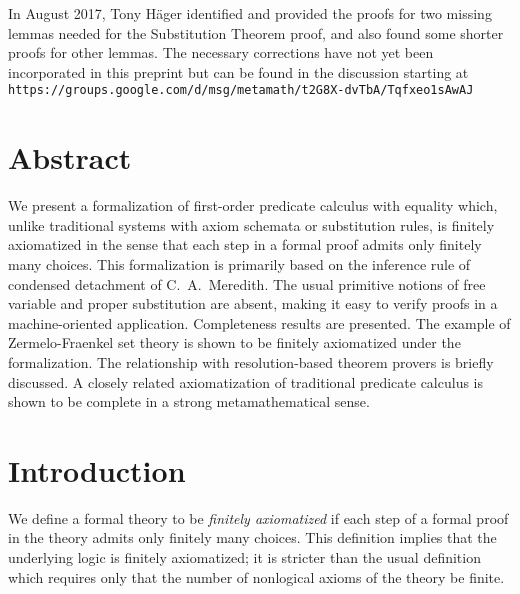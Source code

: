 \documentclass[leqno]{article}
\begin{document}
\begin{titlepage}
\vspace{10ex}

In August 2017, Tony H\"{a}ger identified and provided the proofs for
two missing lemmas needed for the Substitution Theorem proof, and also
found some shorter proofs for other lemmas.  The necessary corrections
have not yet been incorporated in this preprint but can be found in the
discussion starting at \\
{\tt https://groups.google.com/d/msg/metamath/t2G8X-dvTbA/Tqfxeo1sAwAJ}



\vfill
\hfill

\end{titlepage}
\maketitle

\section*{Abstract}

     We present a formalization of first-order predicate calculus with
equality which, unlike traditional systems with axiom schemata or substitution
rules, is finitely axiomatized in the sense that each step in a formal proof
admits only finitely many choices.  This formalization is primarily based on
the inference rule of condensed detachment of C.~A.~Meredith.  The usual
primitive notions of free variable and proper substitution are absent, making
it easy to verify proofs in a machine-oriented application.  Completeness
results are presented.  The example of Zermelo-Fraenkel set theory is shown to
be finitely axiomatized under the formalization.  The relationship with
resolution-based theorem provers is briefly discussed.  A closely related
axiomatization of traditional predicate calculus is shown to be complete in a
strong metamathematical sense.

\section{Introduction}

     We define a formal theory to be {\em finitely axiomatized} if each step
of a formal proof in the theory admits only finitely many choices.  This
definition implies that the underlying logic is finitely axiomatized; it is
stricter than the usual definition which requires only that the number of
nonlogical axioms of the theory be finite.
\end{document}
